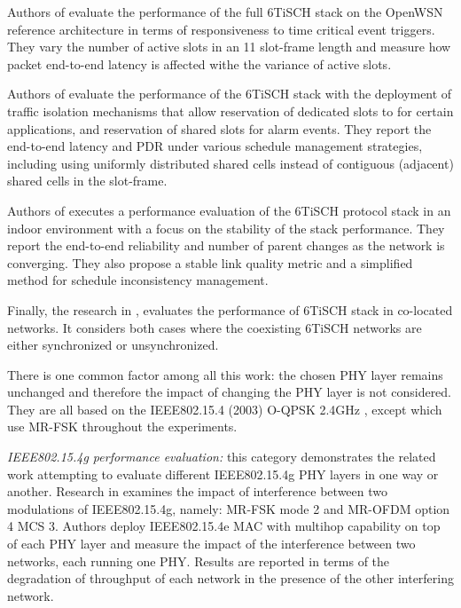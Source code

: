 \documentclass[journal]{IEEEtran}
\newcommand{\oqpsk}        {O-QPSK 2.4GHz }
\begin{document}
Authors of \cite{yang18analysis} evaluate the performance of the full 6TiSCH stack on the OpenWSN reference architecture in terms of responsiveness to time critical event triggers.
They vary the number of active slots in an 11 slot-frame length and measure how packet end-to-end latency is affected withe the variance of active slots. 

Authors of \cite{theoleyre16experimental} evaluate the performance of the 6TiSCH stack with the deployment of traffic isolation mechanisms that allow reservation of dedicated slots to for certain applications, and reservation of shared slots for alarm events.
They report the end-to-end latency and PDR under various schedule management strategies, including using uniformly distributed shared cells instead of contiguous (adjacent) shared cells in the slot-frame.

Authors of \cite{teleshermeto18reactions} executes a performance evaluation of the 6TiSCH protocol stack in an indoor environment with a focus on the stability of the stack performance.
They report the end-to-end reliability and number of parent changes as the network is converging.
They also propose a stable link quality metric and a simplified method for schedule inconsistency management. 

Finally, the research in \cite{benyaala16performance}, evaluates the performance of 6TiSCH stack in co-located networks.
It considers both cases where the coexisting 6TiSCH networks are either  synchronized or unsynchronized.

There is one common factor among all this work: the chosen PHY layer remains unchanged and therefore the impact of changing the PHY layer is not considered. 
They are all based on the IEEE802.15.4 (2003) \oqpsk , except \cite{sum17experimental} which use MR-FSK throughout the experiments. 


\textit{IEEE802.15.4g performance evaluation:} this category  demonstrates the related  work attempting to evaluate different IEEE802.15.4g PHY layers in one way or another.
Research in \cite{kojima15system} examines the impact of interference between two modulations of IEEE802.15.4g, namely: MR-FSK mode 2 and MR-OFDM option 4 MCS 3. 
Authors deploy IEEE802.15.4e MAC with multihop capability on top of each PHY layer and measure the impact of the interference between two networks, each running one PHY.
Results are reported in terms of the degradation of throughput of each network in the presence of the other interfering network.
\end{document}
